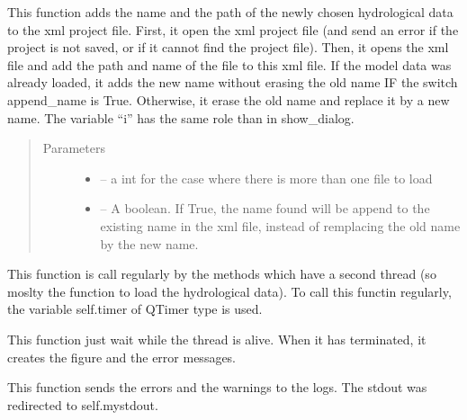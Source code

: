 \documentclass[letterpaper,10pt,english]{sphinxmanual}
\begin{document}
\begin{fulllineitems}
\begin{fulllineitems}
This function adds the name and the path of the newly chosen hydrological data to the xml project file. First,
it open the xml project file (and send an error if the project is not saved, or if it cannot find the project
file). Then, it opens the xml file and add the path and name of the file to this xml file. If the model data was
already loaded, it adds the new name without erasing the old name IF the switch append\_name is True. Otherwise,
it erase the old name and replace it by a new name. The variable “i” has the same role than in show\_dialog.
\begin{quote}\begin{description}
\item[{Parameters}] \leavevmode\begin{itemize}
\item {} 
 -- a int for the case where there is more than one file to load

\item {} 
 -- A boolean. If True, the name found will be append to the existing name in the xml file,
instead of remplacing the old name by the new name.

\end{itemize}

\end{description}\end{quote}

\end{fulllineitems}


\begin{fulllineitems}
\label{\detokenize{index:src_GUI.hydro_GUI_2.SubHydroW.send_data}}
This function is call regularly by the methods which have a second thread (so moslty the function
to load the hydrological data). To call this functin regularly, the variable self.timer of QTimer type is used.

This function just wait while the thread is alive. When it has terminated, it creates the figure and the error messages.

\end{fulllineitems}


\begin{fulllineitems}
\label{\detokenize{index:src_GUI.hydro_GUI_2.SubHydroW.send_err_log}}
This function sends the errors and the warnings to the logs.
The stdout was redirected to self.mystdout.


\end{fulllineitems}
\end{fulllineitems}
\end{document}
